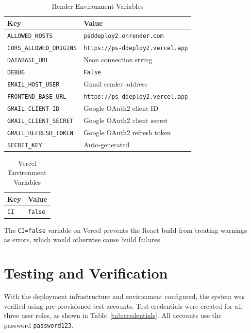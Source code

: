 \documentclass[conference]{IEEEtran}
\begin{document}
\begin{table}[H]
\centering
\caption{Render Environment Variables}
\label{tab:render-env}
\footnotesize
\begin{tabular}{@{}p{3.0cm}p{4.3cm}@{}}
\toprule
\textbf{Key} & \textbf{Value} \\
\midrule
\texttt{ALLOWED\_HOSTS} & \texttt{psddeploy2.onrender.com} \\
\texttt{CORS\_ALLOWED\_\allowbreak ORIGINS} & \texttt{https://ps-ddeploy2.\allowbreak vercel.app} \\
\texttt{DATABASE\_URL} & Neon connection string \\
\texttt{DEBUG} & \texttt{False} \\
\texttt{EMAIL\_HOST\_USER} & Gmail sender address \\
\texttt{FRONTEND\_BASE\_\allowbreak URL} & \texttt{https://ps-ddeploy2.\allowbreak vercel.app} \\
\texttt{GMAIL\_CLIENT\_ID} & Google OAuth2 client ID \\
\texttt{GMAIL\_CLIENT\_\allowbreak SECRET} & Google OAuth2 client secret \\
\texttt{GMAIL\_REFRESH\_\allowbreak TOKEN} & Google OAuth2 refresh token \\
\texttt{SECRET\_KEY} & Auto-generated \\
\bottomrule
\end{tabular}
\end{table}

\begin{table}[H]
\centering
\caption{Vercel Environment Variables}
\label{tab:vercel-env}
\begin{tabular}{@{}p{3.2cm}p{4.1cm}@{}}
\toprule
\textbf{Key} & \textbf{Value} \\
\midrule
\texttt{CI} & \texttt{false} \\
\bottomrule
\end{tabular}
\end{table}

The \texttt{CI=false} variable on Vercel prevents the React build from treating warnings as errors, which would otherwise cause build failures.

\section{Testing and Verification}

With the deployment infrastructure and environment configured, the system was verified using pre-provisioned test accounts. Test credentials were created for all three user roles, as shown in Table~\ref{tab:credentials}. All accounts use the password \texttt{password123}.
\end{document}
